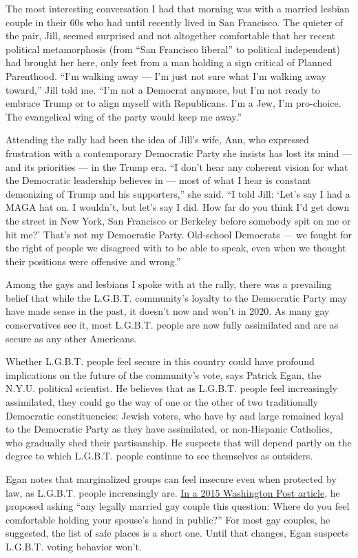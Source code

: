 The most interesting conversation I had that morning was with a married
lesbian couple in their 60s who had until recently lived in San
Francisco. The quieter of the pair, Jill, seemed surprised and not
altogether comfortable that her recent political metamorphosis (from
``San Francisco liberal'' to political independent) had brought her
here, only feet from a man holding a sign critical of Planned
Parenthood. ``I'm walking away --- I'm just not sure what I'm walking
away toward,'' Jill told me. ``I'm not a Democrat anymore, but I'm not
ready to embrace Trump or to align myself with Republicans. I'm a Jew,
I'm pro-choice. The evangelical wing of the party would keep me away.''

Attending the rally had been the idea of Jill's wife, Ann, who expressed
frustration with a contemporary Democratic Party she insists has lost
its mind --- and its priorities --- in the Trump era. ``I don't hear any
coherent vision for what the Democratic leadership believes in --- most
of what I hear is constant demonizing of Trump and his supporters,'' she
said. ``I told Jill: `Let's say I had a MAGA hat on. I wouldn't, but
let's say I did. How far do you think I'd get down the street in New
York, San Francisco or Berkeley before somebody spit on me or hit me?'
That's not my Democratic Party. Old-school Democrats --- we fought for
the right of people we disagreed with to be able to speak, even when we
thought their positions were offensive and wrong.''

Among the gays and lesbians I spoke with at the rally, there was a
prevailing belief that while the L.G.B.T. community's loyalty to the
Democratic Party may have made sense in the past, it doesn't now and
won't in 2020. As many gay conservatives see it, most L.G.B.T. people
are now fully assimilated and are as secure as any other Americans.

Whether L.G.B.T. people feel secure in this country could have profound
implications on the future of the community's vote, says Patrick Egan,
the N.Y.U. political scientist. He believes that as L.G.B.T. people feel
increasingly assimilated, they could go the way of one or the other of
two traditionally Democratic constituencies: Jewish voters, who have by
and large remained loyal to the Democratic Party as they have
assimilated, or non-Hispanic Catholics, who gradually shed their
partisanship. He suspects that will depend partly on the degree to which
L.G.B.T. people continue to see themselves as outsiders.

Egan notes that marginalized groups can feel insecure even when
protected by law, as L.G.B.T. people increasingly are.
\href{https://www.washingtonpost.com/news/monkey-cage/wp/2015/06/29/will-marriage-turn-gay-people-into-republicans-not-anytime-soon/?noredirect=on\&utm_term=.ac915d72c9e0}{In
a 2015 Washington Post article}, he proposed asking ``any legally
married gay couple this question: Where do you feel comfortable holding
your spouse's hand in public?'' For most gay couples, he suggested, the
list of safe places is a short one. Until that changes, Egan suspects
L.G.B.T. voting behavior won't.

